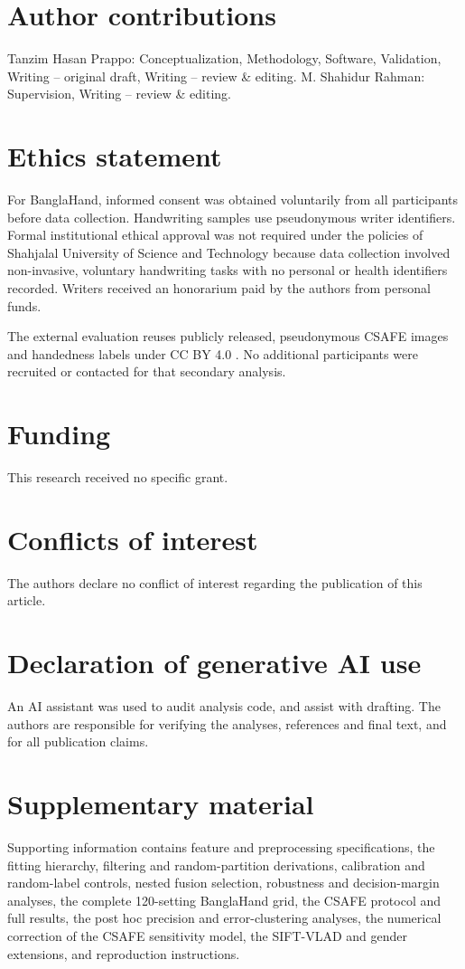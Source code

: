 \documentclass[ASNA,twocolumn]{USG}
\begin{document}
\section*{Author contributions}
Tanzim Hasan Prappo: Conceptualization, Methodology, Software, Validation, Writing -- original draft, Writing -- review \& editing. M. Shahidur Rahman: Supervision, Writing -- review \& editing.

\section*{Ethics statement}
For BanglaHand, informed consent was obtained voluntarily from all participants before data collection. Handwriting samples use pseudonymous writer identifiers. Formal institutional ethical approval was not required under the policies of Shahjalal University of Science and Technology because data collection involved non-invasive, voluntary handwriting tasks with no personal or health identifiers recorded. Writers received an honorarium paid by the authors from personal funds.

The external evaluation reuses publicly released, pseudonymous CSAFE images and handedness labels under CC BY 4.0 \cite{crawford2020database,crawford2026csafe}. No additional participants were recruited or contacted for that secondary analysis.

\section*{Funding}
This research received no specific grant.

\section*{Conflicts of interest}
The authors declare no conflict of interest regarding the publication of this article.

\section*{Declaration of generative AI use}
An AI assistant was used to audit analysis code, and assist with drafting. The authors are responsible for verifying the analyses, references and final text, and for all publication claims.

\section*{Supplementary material}
Supporting information contains feature and preprocessing specifications, the fitting hierarchy, filtering and random-partition derivations, calibration and random-label controls, nested fusion selection, robustness and decision-margin analyses, the complete 120-setting BanglaHand grid, the CSAFE protocol and full results, the post hoc precision and error-clustering analyses, the numerical correction of the CSAFE sensitivity model, the SIFT-VLAD and gender extensions, and reproduction instructions.


\end{document}
